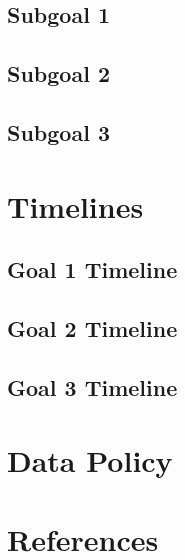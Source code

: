 \documentclass[fleqn]{article}
\begin{document}
\subsection{Subgoal 1}
\subsection{Subgoal 2}
\subsection{Subgoal 3}

\section{Timelines}
\subsection{Goal 1 Timeline}
\subsection{Goal 2 Timeline}
\subsection{Goal 3 Timeline}

\section{Data Policy}

\section{References}
\end{document}
